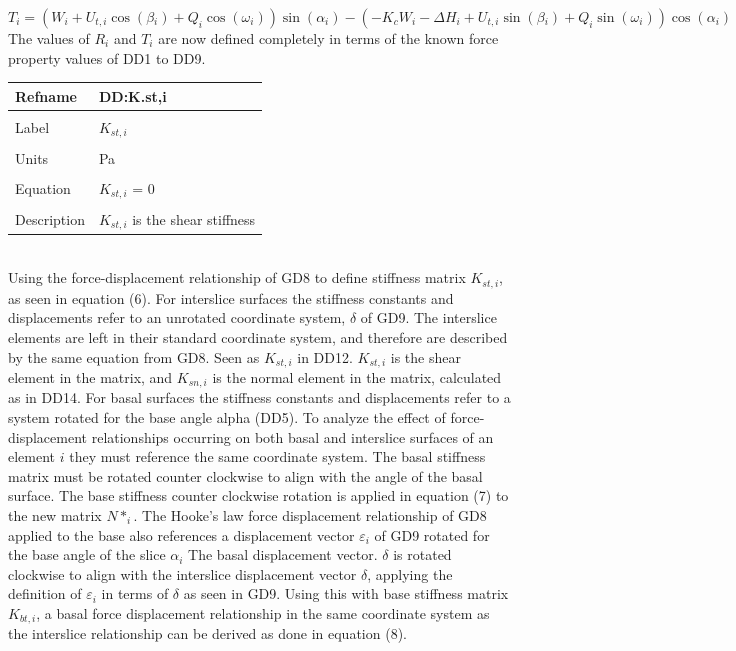 \documentclass[12pt]{article}
\begin{document}
\begin{equation}
T_{i}=\left(W_{i}+U_{t,i}\cos\left(\beta{}_{i}\right)+Q_{i}\cos\left(\omega{}_{i}\right)\right)\sin\left(\alpha{}_{i}\right)-\left(-K_{c}W_{i}-\Delta{}H_{i}+U_{t,i}\sin\left(\beta{}_{i}\right)+Q_{i}\sin\left(\omega{}_{i}\right)\right)\cos\left(\alpha{}_{i}\right)
\end{equation}
The values of $R_{i}$ and $T_{i}$ are now defined completely in terms of the known force property values of DD1 to DD9.
~\newline
\noindent \begin{minipage}{\textwidth}
\begin{tabular}{p{} p{}}
\toprule \textbf{Refname} & \textbf{DD:K.st,i}
\label{DD:K.st,i}
\\ \midrule \\
Label & $K_{st,i}$
\\ \midrule \\
Units & Pa
\\ \midrule \\
Equation & $K_{st,i}$ = $0$
\\ \midrule \\
Description & $K_{st,i}$ is the shear stiffness
\\ \bottomrule \end{tabular}
\end{minipage}\\
Using the force-displacement relationship of GD8 to define stiffness matrix $K_{st,i}$, as seen in equation (6).
For interslice surfaces the stiffness constants and displacements refer to an unrotated coordinate system, $\delta{}$ of GD9. The interslice elements are left in their standard coordinate system, and therefore are described by the same equation from GD8. Seen as $K_{st,i}$ in DD12. $K_{st,i}$ is the shear element in the matrix, and $K_{sn,i}$ is the normal element in the matrix, calculated as in DD14.
For basal surfaces the stiffness constants and displacements refer to a system rotated for the base angle alpha (DD5). To analyze the effect of force-displacement relationships occurring on both basal and interslice surfaces of an element $i$ they must reference the same coordinate system. The basal stiffness matrix must be rotated counter clockwise to align with the angle of the basal surface. The base stiffness counter clockwise rotation is applied in equation (7) to the new matrix $N*_{i}$.
The Hooke's law force displacement relationship of GD8 applied to the base also references a displacement vector $\varepsilon{}_{i}$ of GD9 rotated for the base angle of the slice $\alpha{}_{i}$ The basal displacement vector. $\delta{}$ is rotated clockwise to align with the interslice displacement vector $\delta{}$, applying the definition of $\varepsilon{}_{i}$ in terms of $\delta{}$ as seen in GD9. Using this with base stiffness matrix $K_{bt,i}$, a basal force displacement relationship in the same coordinate system as the interslice relationship can be derived as done in equation (8).
\end{document}
